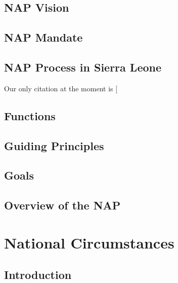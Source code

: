 \documentclass[
]{book}
\begin{document}
\hypertarget{nap-vision}{%
\section{NAP Vision}\label{nap-vision}}

\hypertarget{nap-mandate}{%
\section{NAP Mandate}\label{nap-mandate}}

\hypertarget{nap-process-in-sierra-leone}{%
\section{NAP Process in Sierra Leone}\label{nap-process-in-sierra-leone}}

Our only citation at the moment is {[}\citet{xie2015}

\hypertarget{functions}{%
\section{Functions}\label{functions}}

\hypertarget{guiding-principles}{%
\section{Guiding Principles}\label{guiding-principles}}

\hypertarget{goals}{%
\section{Goals}\label{goals}}

\hypertarget{overview-of-the-nap}{%
\section{Overview of the NAP}\label{overview-of-the-nap}}

\hypertarget{national-circumstances}{%
\chapter{National Circumstances}\label{national-circumstances}}

\hypertarget{introduction-1}{%
\section{Introduction}\label{introduction-1}}
\end{document}
